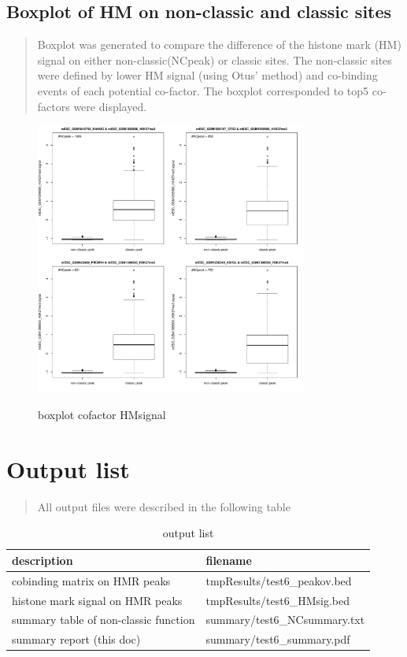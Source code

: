 \documentclass[11pt,a4paper]{article}
\begin{document}
\subsection{Boxplot of HM on non-classic and classic sites}
\begin{quotation}
Boxplot was generated to compare the difference of the histone mark (HM) signal on either non-classic(NCpeak) or classic sites. The non-classic sites were defined by lower HM signal (using Otus' method) and co-binding events of each potential co-factor. The boxplot corresponded to top5 co-factors were displayed.  
\end{quotation}
\begin{figure}[h]
        \caption{boxplot cofactor HMsignal} \label{fig:profileunion}
        \setlength{\abovecaptionskip}{0pt}
        \setlength{\belowcaptionskip}{10pt}
        \centering
        {\includegraphics[width=0.8\textwidth]{test6_coTF_HMsignal.pdf}}
\end{figure}

\newpage
\newpage
\section{Output list}
\begin{quotation}
All output files were described in the following table
\end{quotation}
\begin{table}[h]
\caption{output list}\label{bstable}
\begin{tabularx}{\textwidth}{ |X|l| }
    
\hline
description & filename \\
\hline
cobinding matrix on HMR peaks & tmpResults/test6\_peakov.bed \\
\hline
histone mark signal on HMR peaks & tmpResults/test6\_HMsig.bed \\
\hline
summary table of non-classic function & summary/test6\_NCsummary.txt \\
\hline
summary report (this doc) & summary/test6\_summary.pdf \\
\hline

\end{tabularx}
\end{table} 
\end{document}
